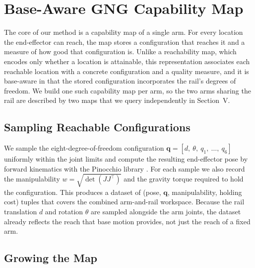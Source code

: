 \documentclass[conference]{IEEEtran}
\begin{document}
\section{Base-Aware GNG Capability Map}

The core of our method is a capability map of a single arm. For every location the
end-effector can reach, the map stores a configuration that reaches it and a
measure of how good that configuration is. Unlike a reachability map, which encodes
only whether a location is attainable, this representation associates each
reachable location with a concrete configuration and a quality measure, and it is
base-aware in that the stored configuration incorporates the rail's degrees of
freedom. We build one such capability map per arm, so the two arms sharing the rail
are described by two maps that we query independently in Section~V.

\subsection{Sampling Reachable Configurations}

We sample the eight-degree-of-freedom configuration
$\mathbf{q} = [d,\ \theta,\ q_1,\ \ldots,\ q_6]$ uniformly within the joint limits
and compute the resulting end-effector pose by forward kinematics with the
Pinocchio library \cite{Carpentier2019}. For each sample we also record the
manipulability $w = \sqrt{\det(JJ^\top)}$ \cite{Yoshikawa1985} and the gravity
torque required to hold the configuration. This produces a dataset of
(pose, $\mathbf{q}$, manipulability, holding cost) tuples that covers the combined
arm-and-rail workspace. Because the rail translation $d$ and rotation $\theta$ are
sampled alongside the arm joints, the dataset already reflects the reach that base
motion provides, not just the reach of a fixed arm.

\subsection{Growing the Map}
\end{document}
